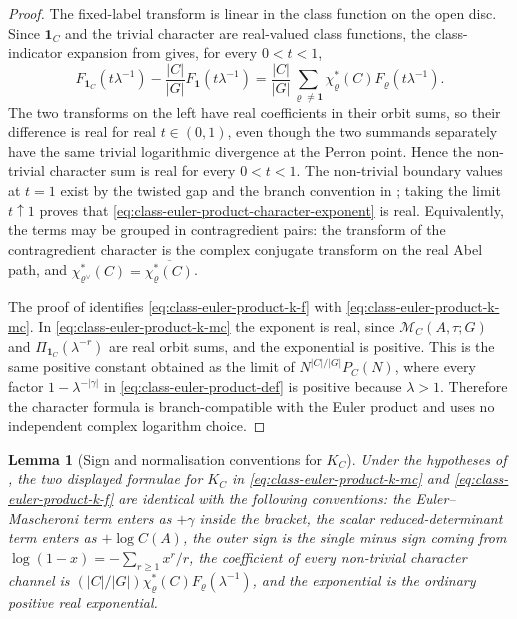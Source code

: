 \documentclass[11pt,a4paper]{amsart}
\theoremstyle{plain}
\newtheorem{lemma}[theorem]{Lemma}
\theoremstyle{definition}
\theoremstyle{remark}
\begin{document}
\begin{proof}
  The fixed-label transform is linear in the class function on the open
  disc. Since \(\mathbf1_C\) and the trivial character are real-valued
  class functions, the class-indicator expansion from
   gives, for every \(0<t<1\),
  \[
    F_{\mathbf1_C}(t\lambda^{-1})
    -
    \frac{|C|}{|G|}F_{\mathbf1}(t\lambda^{-1})
    =
    \frac{|C|}{|G|}
      \sum_{\varrho\neq\mathbf1}
        \chi_\varrho^\ast(C)F_\varrho(t\lambda^{-1}).
  \]
  The two transforms on the left have real coefficients in their orbit
  sums, so their difference is real for real \(t\in(0,1)\), even though
  the two summands separately have the same trivial logarithmic
  divergence at the Perron point. Hence the non-trivial character sum is
  real for every \(0<t<1\). The non-trivial boundary values at \(t=1\)
  exist by the twisted gap and the branch convention in
  ; taking the limit
  \(t\uparrow1\) proves that
  \eqref{eq:class-euler-product-character-exponent} is real. Equivalently,
  the terms may be grouped in contragredient pairs: the transform of the
  contragredient character is the complex conjugate transform on the real
  Abel path, and
  \(\chi_{\varrho^\vee}^\ast(C)=\overline{\chi_\varrho^\ast(C)}\).

  The proof of  identifies
  \eqref{eq:class-euler-product-k-f} with
  \eqref{eq:class-euler-product-k-mc}. In
  \eqref{eq:class-euler-product-k-mc} the exponent is real, since
  \(\mathcal M_C(A,\tau;G)\) and
  \(\Pi_{\mathbf1_C}(\lambda^{-r})\) are real orbit sums, and the
  exponential is positive. This is the same positive constant obtained as
  the limit of
  \(N^{|C|/|G|}P_C(N)\), where every factor
  \(1-\lambda^{-|\gamma|}\) in \eqref{eq:class-euler-product-def} is
  positive because \(\lambda>1\). Therefore the character formula is
  branch-compatible with the Euler product and uses no independent
  complex logarithm choice.
\end{proof}

\begin{lemma}[Sign and normalisation conventions for \texorpdfstring{$K_C$}{KC}]
  \label{lem:class-product-sign-normalisation-conventions}
  Under the hypotheses of , the two
  displayed formulae for \(K_C\) in
  \eqref{eq:class-euler-product-k-mc} and
  \eqref{eq:class-euler-product-k-f} are identical with the following
  conventions: the Euler--Mascheroni term enters as \(+\gamma\) inside
  the bracket, the scalar reduced-determinant term enters as
  \(+\log C(A)\), the outer sign is the single minus sign coming from
  \(\log(1-x)=-\sum_{r\ge1}x^r/r\), the coefficient of every
  non-trivial character channel is
  \((|C|/|G|)\chi_\varrho^\ast(C)F_\varrho(\lambda^{-1})\), and
  the exponential is the ordinary positive real exponential.
\end{lemma}
\end{document}
